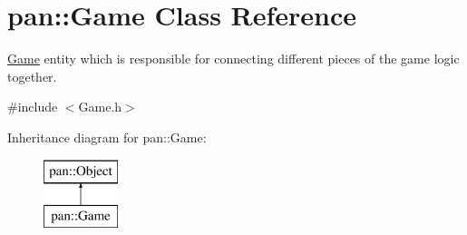 \hypertarget{classpan_1_1_game}{}\section{pan\+:\+:Game Class Reference}
\label{classpan_1_1_game}


\hyperlink{classpan_1_1_game}{Game} entity which is responsible for connecting different pieces of the game logic together.  




{\ttfamily \#include $<$Game.\+h$>$}

Inheritance diagram for pan\+:\+:Game\+:\begin{figure}[H]
\begin{center}
\leavevmode
\includegraphics[height=2.000000cm]{classpan_1_1_game}
\end{center}
\end{figure}
